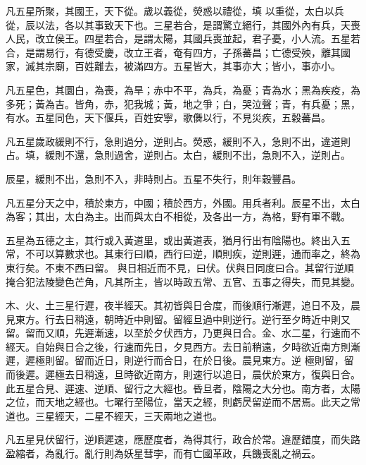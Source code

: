 \begin{pinyinscope}
 凡五星所聚，其國王，天下從。歲以義從，熒惑以禮從，填
 以重從，太白以兵從，辰以法，各以其事致天下也。三星若合，是謂驚立絕行，其國外內有兵，天喪人民，改立侯王。四星若合，是謂太陽，其國兵喪並起，君子憂，小人流。五星若合，是謂易行，有德受慶，改立王者，奄有四方，子孫蕃昌；亡德受殃，離其國家，滅其宗廟，百姓離去，被滿四方。五星皆大，其事亦大；皆小，事亦小。



 凡五星色，其圜白，為喪，為旱；赤中不平，為兵，為憂；青為水；黑為疾疫，為多死；黃為吉。皆角，赤，犯我城；黃，地之爭；白，哭泣聲；青，有兵憂；黑，有水。五星同色，天下偃兵，百姓安寧，歌儛以行，不見災疾，五穀蕃昌。



 凡五星歲政緩則不行，急則過分，逆則占。熒惑，緩則不入，急則不出，違道則占。填，緩則不還，急則過舍，逆則占。太白，緩則不出，急則不入，逆則占。



 辰星，緩則不出，急則不入，非時則占。五星不失行，則年穀豐昌。



 凡五星分天之中，積於東方，中國；積於西方，外國。用兵者利。辰星不出，太白為客；其出，太白為主。出而與太白不相從，及各出一方，為格，野有軍不戰。



 五星為五德之主，其行或入黃道里，或出黃道表，猶月行出有陰陽也。終出入五常，不可以算數求也。其東行曰順，西行曰逆，順則疾，逆則遲，通而率之，終為東行矣。不東不西曰留。
 與日相近而不見，曰伏。伏與日同度曰合。其留行逆順掩合犯法陵變色芒角，凡其所主，皆以時政五常、五官、五事之得失，而見其變。



 木、火、土三星行遲，夜半經天。其初皆與日合度，而後順行漸遲，追日不及，晨見東方。行去日稍遠，朝時近中則留。留經旦過中則逆行。逆行至夕時近中則又留。留而又順，先遲漸速，以至於夕伏西方，乃更與日合。金、水二星，行速而不經天。自始與日合之後，行速而先日，夕見西方。去日前稍遠，夕時欲近南方則漸遲，遲極則留。留而近日，則逆行而合日，在於日後。晨見東方。逆
 極則留，留而後遲。遲極去日稍遠，旦時欲近南方，則速行以追日，晨伏於東方，復與日合。此五星合見、遲速、逆順、留行之大經也。昏旦者，陰陽之大分也。南方者，太陽之位，而天地之經也。七曜行至陽位，當天之經，則虧昃留逆而不居焉。此天之常道也。三星經天，二星不經天，三天兩地之道也。



 凡五星見伏留行，逆順遲速，應歷度者，為得其行，政合於常。違歷錯度，而失路盈縮者，為亂行。亂行則為妖星彗孛，而有亡國革政，兵饑喪亂之禍云。




\end{pinyinscope}
